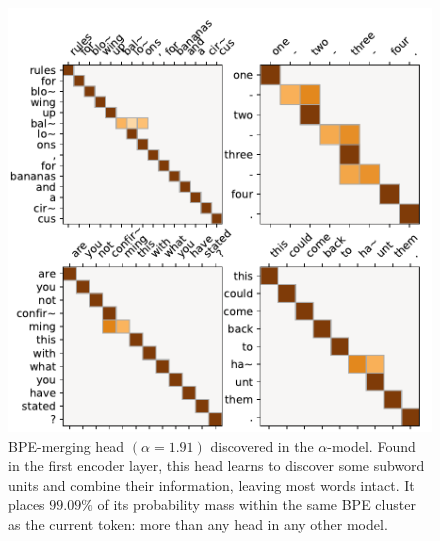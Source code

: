 \begin{figure}[t]
    \centering
    \includegraphics[width=0.95\columnwidth]{Figures/head_bpe}
    \caption{%
        BPE-merging head $(\alpha=1.91)$ discovered in the
        $\alpha$-\entmaxtext model. Found in the first encoder layer,
        this head learns to discover some subword units and combine their
        information, leaving most words intact. It places $99.09\%$ of
        its probability mass within the same BPE cluster as the current
        token: more than any head in any other model.}
    \label{fig:head_bpe}
\end{figure}

